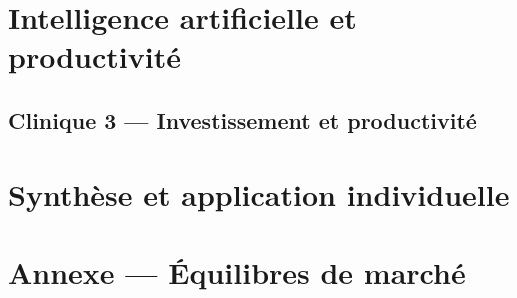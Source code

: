 \documentclass[aspectratio=169]{beamer}
\begin{document}
\section{Intelligence artificielle et productivité}

\subsection{Clinique 3 — Investissement et productivité}

\section{Synthèse et application individuelle}

\appendix
\section{Annexe — Équilibres de marché}
\newcommand{\equilibreMarche}[6]{%
  \begin{tikzpicture}[unites marche,font=\footnotesize,
    courbe/.style={line width=1.15pt,line cap=round}]
    \repereMarcheEMBA
    \coordinate (dG) at (0,3.8); \coordinate (dD) at (5.5,.5);
    \coordinate (sG) at (0,.2);  \coordinate (sD) at (5.5,3.5);
    \coordinate (E) at (intersection of dG--dD and sG--sD);
    \draw[black!28,thin] (O |- E) node[left,text=black] {#3} -- (E)
      -- (E |- O) node[below,text=black] {#4};
    \draw[courbe] (dG) -- (dD) node[right,curvelabel] {#5};
    \draw[courbe,offreEMBA] (sG) -- (sD) node[right,curvelabel] {#6};
    \filldraw[fill=white,draw=black] (E) circle (2.4pt);
    \draw[econaxis] (O) -- (axeQuantite) node[below left] {#2};
    \draw[econaxis] (O) -- (axePrix) node[anchor=south west,inner xsep=0pt] {#1};
  \end{tikzpicture}}
\end{document}
